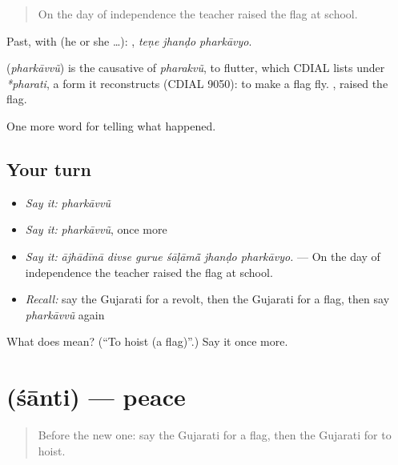 \begin{quote}
On the day of independence the teacher raised the flag at school.
\end{quote}

Past, with  (he or she …):   , \emph{teṇe jhanḍo pharkāvyo}.

\begin{cousinweb}
\textbf{} (\emph{pharkāvvũ}) is the causative of \emph{pharakvũ}, to flutter, which CDIAL lists under \emph{*pharati}, a form it reconstructs (CDIAL 9050): to make a flag fly. \textbf{ }, raised the flag.
\end{cousinweb}

\begin{grammarlens}[title={What you've built}]
One more word for telling what happened.
\end{grammarlens}

\subsection*{Your turn}
\begin{itemize}
\raggedright
  \item \emph{Say it:} \emph{pharkāvvũ}
  \item \emph{Say it:} \emph{pharkāvvũ}, once more
  \item \emph{Say it:} \emph{ājhādīnā divse gurue śāḷāmā̃ jhanḍo pharkāvyo.} — On the day of independence the teacher raised the flag at school.
  \item \emph{Recall:} say the Gujarati for a revolt, then the Gujarati for a flag, then say \emph{pharkāvvũ} again
\end{itemize}

\begin{tcolorbox}[breakable,colback=teal!4,colframe=teal!35!black,title={Before you move on}]
What does  mean? (\textquotedblleft{}To hoist (a flag)\textquotedblright{}.) Say it once more.
\end{tcolorbox}
\section[\texorpdfstring{\gu{શાંતિ} (śānti)}{શાંતિ (śānti)}]{ (śānti) — peace}

\label{lesson:GU-C326-santi}



\begin{quote}
Before the new one: say the Gujarati for a flag, then the Gujarati for to hoist.
\end{quote}

